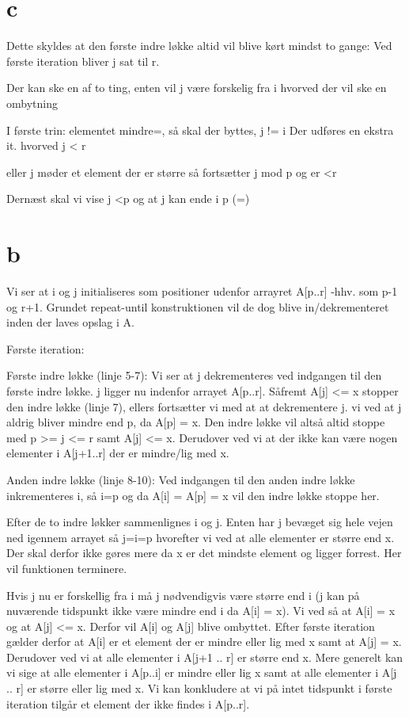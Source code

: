 \section{c}
Dette skyldes at den første indre løkke altid vil blive kørt mindst to gange: Ved første iteration bliver j sat til r. 




Der kan ske en af to ting, enten vil j være forskelig fra i hvorved der vil ske en ombytning




I første trin:
elementet mindre=, så skal der byttes, j != i
Der udføres en ekstra it. hvorved j < r

eller
j møder et element der er større så fortsætter j mod p og er <r




Dernæst skal vi vise
j <p
og at j kan ende i p (=)









\section{b}
Vi ser at i og j initialiseres som positioner udenfor arrayret A[p..r] -hhv. som p-1 og r+1.
Grundet repeat-until konstruktionen vil de dog blive in/dekrementeret inden der laves opslag i A.

Første iteration:

Første indre løkke (linje 5-7):
Vi ser at j dekrementeres ved indgangen til den første indre løkke. j ligger nu indenfor arrayet A[p..r]. 
Såfremt A[j] <= x stopper den indre løkke (linje 7), ellers fortsætter vi med at at dekrementere j.
vi ved at j aldrig bliver mindre end p, da A[p] = x. Den indre løkke vil altså altid stoppe med p >= j <= r samt A[j] <= x.
Derudover ved vi at der ikke kan være nogen elementer i A[j+1..r] der er mindre/lig med x.
 
Anden indre løkke (linje 8-10):
Ved indgangen til den anden indre løkke inkrementeres i, så i=p og da A[i] = A[p] = x vil den indre løkke stoppe her.

Efter de to indre løkker sammenlignes i og j.
Enten har j bevæget sig hele vejen ned igennem arrayet så j=i=p hvorefter vi ved at alle elementer er større end x. Der skal derfor ikke gøres mere da x er det mindste element og ligger forrest. Her vil funktionen terminere.

Hvis j nu er forskellig fra i må j nødvendigvis være større end i (j kan på nuværende tidspunkt ikke være mindre end i da A[i] = x).
Vi ved så at A[i] = x og at A[j] <= x. Derfor vil A[i] og A[j] blive ombyttet.
Efter første iteration gælder derfor at A[i] er et element der er mindre eller lig med x samt at A[j] = x. Derudover ved vi at alle elementer i A[j+1 .. r] er større end x.
Mere generelt kan vi sige at alle elementer i A[p..i] er mindre eller lig x samt at alle elementer i A[j .. r] er større eller lig med x.
Vi kan konkludere at vi på intet tidspunkt i første iteration tilgår et element der ikke findes i A[p..r].


